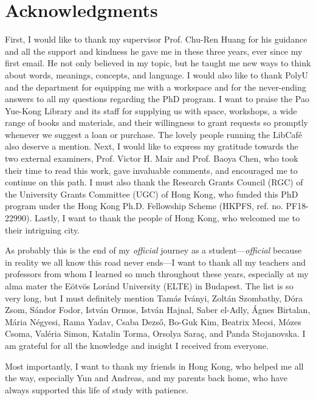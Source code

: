 \chapter*{Acknowledgments}
\label{ch:acknowledgments}


First, I would like to thank my supervisor Prof. Chu-Ren Huang for his guidance and all the support and kindness he gave me in these three years, ever since my first email. He not only believed in my topic, but he taught me new ways to think about words, meanings, concepts, and language. I would also like to thank PolyU and the department for equipping me with a workspace and for the never-ending answers to all my questions regarding the PhD program. I want to praise the Pao Yue-Kong Library and its staff for supplying us with space, workshops, a wide range of books and materials, and their willingness to grant requests so promptly whenever we suggest a loan or purchase. The lovely people running the LibCafé also deserve a mention. Next, I would like to express my gratitude towards the two external examiners, Prof. Victor H. Mair and Prof. Baoya Chen, who took their time to read this work, gave invaluable comments, and encouraged me to continue on this path. I must also thank the Research Grants Council (RGC) of the University Grants Committee (UGC) of Hong Kong, who funded this PhD program under the Hong Kong Ph.D. Fellowship Scheme (HKPFS, ref. no. PF18-22990). Lastly, I want to thank the people of Hong Kong, who welcomed me to their intriguing city.

\medskip

As probably this is the end of my \textit{official} journey as a student---\textit{official} because in reality we all know this road never ends---I want to thank all my teachers and professors from whom I learned so much throughout these years, especially at my alma mater the Eötvös Loránd University (ELTE) in Budapest. The list is so very long, but I must definitely mention Tamás Iványi, Zoltán Szombathy, Dóra Zsom, Sándor Fodor, István Ormos, István Hajnal, Saber el-Adly, Ágnes Birtalan, Mária Négyesi, Rama Yadav, Csaba Dezső, Bo-Guk Kim, Beatrix Mecsi, Mózes Csoma, Valéria Simon, Katalin Torma, Orsolya Saraç, and Panda Stojanovska. I am grateful for all the knowledge and insight I received from everyone. 

\medskip

Most importantly, I want to thank my friends in Hong Kong, who helped me all the way, especially Yun and Andreas, and my parents back home, who have always supported this life of study with patience.






